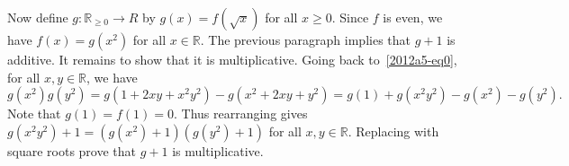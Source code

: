 \documentclass{article}
\newcommand{\R}{\mathbb{R}}
\begin{document}
Now define $g : \R_{\geq 0} \to R$ by $g(x) = f(\sqrt{x})$ for all $x \geq 0$.
Since $f$ is even, we have $f(x) = g(x^2)$ for all $x \in \R$.
The previous paragraph implies that $g + 1$ is additive.
It remains to show that it is multiplicative.
Going back to~\eqref{2012a5-eq0}, for all $x, y \in \R$, we have
\[ g(x^2) g(y^2) = g(1 + 2xy + x^2 y^2) - g(x^2 + 2xy + y^2) = g(1) + g(x^2 y^2) - g(x^2) - g(y^2). \]
Note that $g(1) = f(1) = 0$.
Thus rearranging gives $g(x^2 y^2) + 1 = (g(x^2) + 1)(g(y^2) + 1)$ for all $x, y \in \R$.
Replacing with square roots prove that $g + 1$ is multiplicative.
\end{document}
